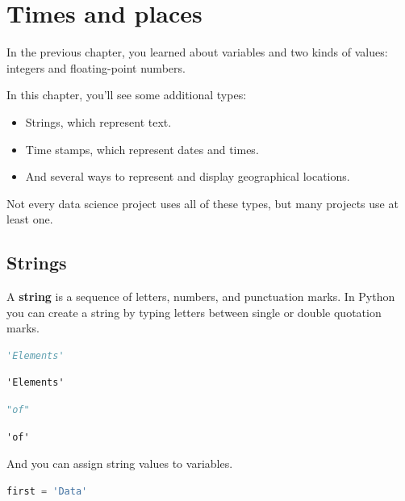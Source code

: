 \hypertarget{times-and-places}{%
\chapter{Times and places}\label{times-and-places}}

In the previous chapter, you learned about variables and two kinds of
values: integers and floating-point numbers.

In this chapter, you'll see some additional types:

\begin{itemize}
\item
  Strings, which represent text.
\item
  Time stamps, which represent dates and times.
\item
  And several ways to represent and display geographical locations.
\end{itemize}

Not every data science project uses all of these types, but many
projects use at least one.

\hypertarget{strings}{%
\section{Strings}\label{strings}}

A \textbf{string} is a sequence of letters, numbers, and punctuation
marks. In Python you can create a string by typing letters between
single or double quotation marks.

\begin{lstlisting}[language=Python,style=source]
'Elements'
\end{lstlisting}

\begin{lstlisting}[style=output]
'Elements'
\end{lstlisting}

\begin{lstlisting}[language=Python,style=source]
"of"
\end{lstlisting}

\begin{lstlisting}[style=output]
'of'
\end{lstlisting}

And you can assign string values to variables.

\begin{lstlisting}[language=Python,style=source]
first = 'Data'
\end{lstlisting}

